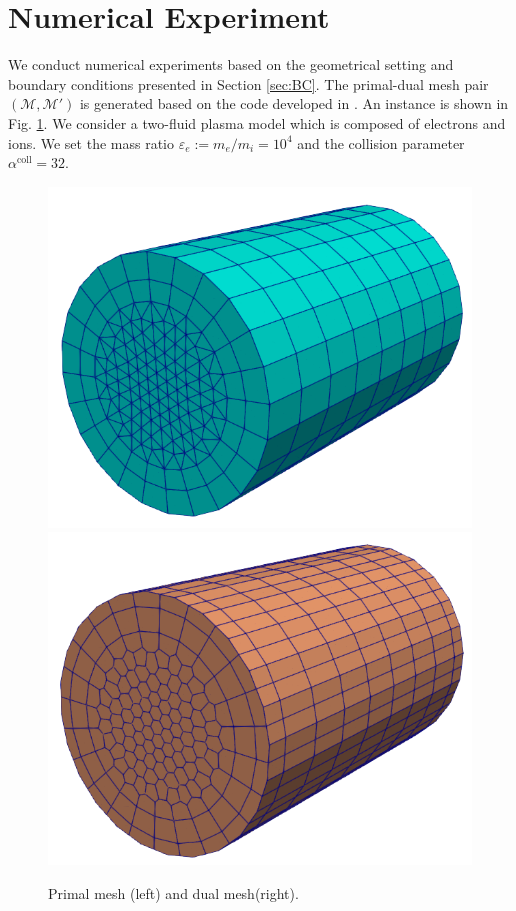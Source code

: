 \documentclass{article}
\begin{document}
\section{Numerical Experiment}
We conduct numerical experiments based on the geometrical setting and boundary conditions presented in Section \ref{sec:BC}. The primal-dual mesh pair $(\mathcal{M}, \mathcal{M}')$ is generated based on the code developed in \cite[][ch. 1]{fuchs_2021}. An instance is shown in Fig. \ref{fig:primal_dual_meshes}. We consider a two-fluid plasma model which is composed of electrons and ions. We set the mass ratio $\varepsilon_e := m_e / m_i = 10^4$ and the collision parameter $\alpha^\text{coll} = 32$.
\begin{figure}
    \centering
    \includegraphics[scale=0.3]{primal_mesh.png}
    \hspace{1cm}
    \includegraphics[scale=0.3]{dual_mesh.png}
    \caption{Primal mesh (left) and dual mesh(right).}
    \label{fig:primal_dual_meshes}
\end{figure}
\end{document}
